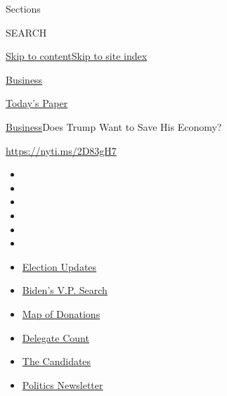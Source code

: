 Sections

SEARCH

\protect\hyperlink{site-content}{Skip to
content}\protect\hyperlink{site-index}{Skip to site index}

\href{https://www.nytimes3xbfgragh.onion/section/business}{Business}

\href{https://myaccount.nytimes3xbfgragh.onion/auth/login?response_type=cookie\&client_id=vi}{}

\href{https://www.nytimes3xbfgragh.onion/section/todayspaper}{Today's
Paper}

\href{/section/business}{Business}\textbar{}Does Trump Want to Save His
Economy?

\url{https://nyti.ms/2D83gH7}

\begin{itemize}
\item
\item
\item
\item
\item
\item
\end{itemize}

\begin{itemize}
\item
  \href{https://www.nytimes3xbfgragh.onion/2020/08/03/us/elections/biden-vs-trump.html?action=click\&pgtype=Article\&state=default\&region=TOP_BANNER\&context=storylines_menu}{Election
  Updates}
\item
  \href{https://www.nytimes3xbfgragh.onion/article/biden-vice-president-2020.html?action=click\&pgtype=Article\&state=default\&region=TOP_BANNER\&context=storylines_menu}{Biden's
  V.P. Search}
\item
  \href{https://www.nytimes3xbfgragh.onion/interactive/2020/07/24/us/politics/trump-biden-campaign-donors.html?action=click\&pgtype=Article\&state=default\&region=TOP_BANNER\&context=storylines_menu}{Map
  of Donations}
\item
  \href{https://www.nytimes3xbfgragh.onion/interactive/2020/us/elections/delegate-count-primary-results.html?action=click\&pgtype=Article\&state=default\&region=TOP_BANNER\&context=storylines_menu}{Delegate
  Count}
\item
  \href{https://www.nytimes3xbfgragh.onion/interactive/2019/us/politics/2020-presidential-candidates.html?action=click\&pgtype=Article\&state=default\&region=TOP_BANNER\&context=storylines_menu}{The
  Candidates}
\item
  \href{https://www.nytimes3xbfgragh.onion/newsletters/politics?action=click\&pgtype=Article\&state=default\&region=TOP_BANNER\&context=storylines_menu}{Politics
  Newsletter}
\end{itemize}

